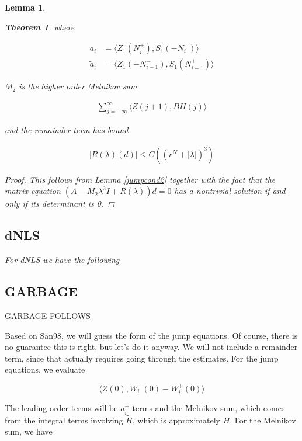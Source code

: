 \documentclass[12pt]{article}
\newtheorem{lemma}{Lemma}
\newtheorem{theorem}{Theorem}
\begin{document}
\begin{lemma}
\begin{theorem}
where

\begin{align*}
a_i &= \langle Z_1(N_i^+), S_1(-N_i^-) \rangle \\
\tilde{a}_i &= \langle Z_1(-N_{i-1}^-), S_1(N_{i-1}^+) \rangle
\end{align*}

$M_2$ is the higher order Melnikov sum

\begin{align}\label{M2}
\sum_{j = -\infty}^{\infty} \langle Z(j+1), B H(j)\rangle
\end{align}

and the remainder term has bound

\begin{align}\label{Rbound2}
|R(\lambda)(d)| \leq C\left( (r^N + |\lambda|)^3 \right)
\end{align}

\begin{proof}
This follows from Lemma \ref{jumpcond2} together with the fact that the matrix equation $(A - M_2 \lambda^2 I + R(\lambda) )d = 0$ has a nontrivial solution if and only if its determinant is 0.
\end{proof}

\end{theorem}

\subsection{dNLS}

For dNLS we have the following





\end{lemma}

\subsection{GARBAGE}
GARBAGE FOLLOWS

Based on San98, we will guess the form of the jump equations. Of course, there is no guarantee this is right, but let's do it anyway. We will not include a remainder term, since that actually requires going through the estimates. For the jump equations, we evaluate

\[
\langle Z(0), W_i^-(0) - W_i^+(0) \rangle
\]

The leading order terms will be $a_i^\pm$ terms and the Melnikov sum, which comes from the integral terms involving $\tilde{H}$, which is approximately $H$. For the Melnikov sum, we have
\end{document}
